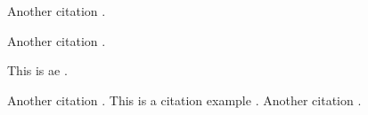 \documentclass{article}
\begin{document}
Another citation \cite{ref1}.




Another citation \cite{ref3}.




This is ae \cite{ref1, ref2}.

Another citation \cite{ref1}.
This is a citation example \cite{ref1, ref4}.
Another citation \cite{ref3}.
\end{document}
